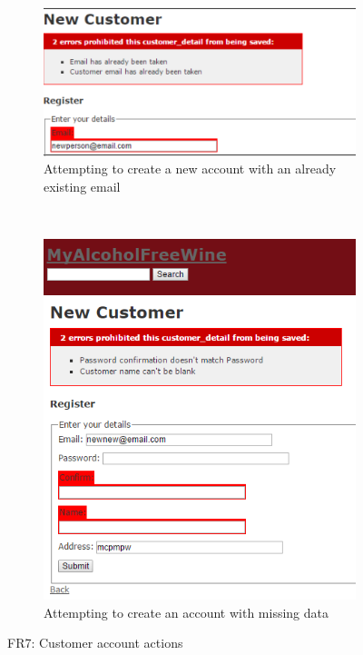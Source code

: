 \documentclass[12pt]{article}
\begin{document}
\begin{figure}[H]
    \centering
    \begin{subfigure}[b]{0.4\textwidth}
        \includegraphics[width=\textwidth]{assets/FR7_screen_7}
        \caption{Attempting to create a new account with an already existing email}
        \label{fig:FR7 Duplicate}
    \end{subfigure}
    ~ %
    \begin{subfigure}[b]{0.4\textwidth}
        \includegraphics[width=\textwidth]{assets/FR7_screen_8}
        \caption{Attempting to create an account with missing data}
        \label{fig:FR7 Missing data}
    \end{subfigure}
    \caption{FR7: Customer account actions}\label{fig:FR7 Customer Account 3}
\end{figure}
\end{document}
